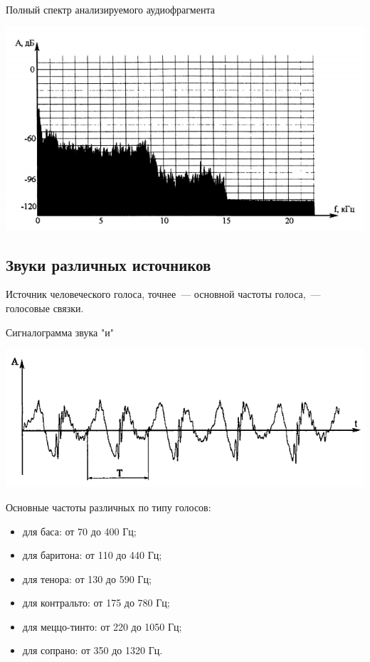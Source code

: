 \documentclass{beamer}
\begin{document}
\begin{frame}
\begin{block}{Полный спектр анализируемого аудиофрагмента}
\begin{center}
\includegraphics[scale=0.6]{pic-specter-09}
\end{center}
\end{block}
\end{frame} 

\subsection{Звуки различных источников}
\begin{frame}
Источник человеческого голоса, точнее~--- основной частоты голоса,~--- голосовые связки. 
\begin{block}{Сигналограмма звука "и"}
\begin{center}
\includegraphics[scale=0.5]{pic-soundkind-01}
\end{center}
\end{block}
Основные частоты различных по типу голосов:
\begin{itemize}
  \item для баса: от 70 до 400 Гц;
  \item для баритона: от 110 до 440 Гц;
  \item для тенора: от 130 до 590 Гц;
  \item для контральто: от 175 до 780 Гц;
  \item для меццо-тинто: от 220 до 1050 Гц;
  \item для сопрано: от 350 до 1320 Гц.
\end{itemize}
\end{frame}   
   
\end{document}
